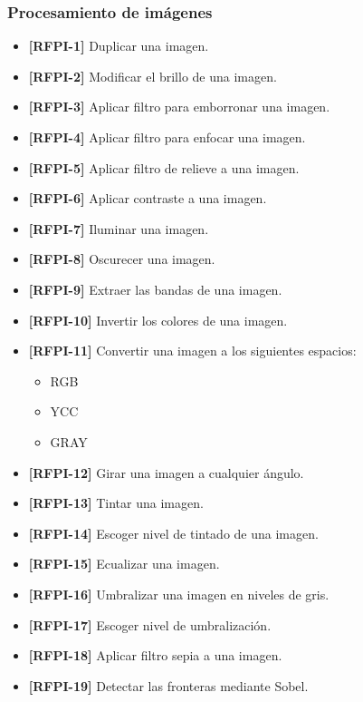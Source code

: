 \subsubsection{Procesamiento de imágenes}
\begin{itemize}
\item{\textbf{[RFPI-1]} Duplicar una imagen.}
\item{\textbf{[RFPI-2]} Modificar el brillo de una imagen.}
\item{\textbf{[RFPI-3]} Aplicar filtro para emborronar una imagen.}
\item{\textbf{[RFPI-4]} Aplicar filtro para enfocar una imagen.}
\item{\textbf{[RFPI-5]} Aplicar filtro de relieve a una imagen.}
\item{\textbf{[RFPI-6]} Aplicar contraste a una imagen.}
\item{\textbf{[RFPI-7]} Iluminar una imagen.}
\item{\textbf{[RFPI-8]} Oscurecer una imagen.}
\item{\textbf{[RFPI-9]} Extraer las bandas de una imagen.}
\item{\textbf{[RFPI-10]} Invertir los colores de una imagen.}
\item{\textbf{[RFPI-11]} Convertir una imagen a los siguientes espacios:
\begin{itemize}
\item{RGB}
\item{YCC}
\item{GRAY}
\end{itemize}
}
\item{\textbf{[RFPI-12]} Girar una imagen a cualquier ángulo.}
\item{\textbf{[RFPI-13]} Tintar una imagen.}
\item{\textbf{[RFPI-14]} Escoger nivel de tintado de una imagen.}
\item{\textbf{[RFPI-15]} Ecualizar una imagen.}
\item{\textbf{[RFPI-16]} Umbralizar una imagen en niveles de gris.}
\item{\textbf{[RFPI-17]} Escoger nivel de umbralización.}
\item{\textbf{[RFPI-18]} Aplicar filtro sepia a una imagen.}
\item{\textbf{[RFPI-19]} Detectar las fronteras mediante Sobel.}

\end{itemize}
